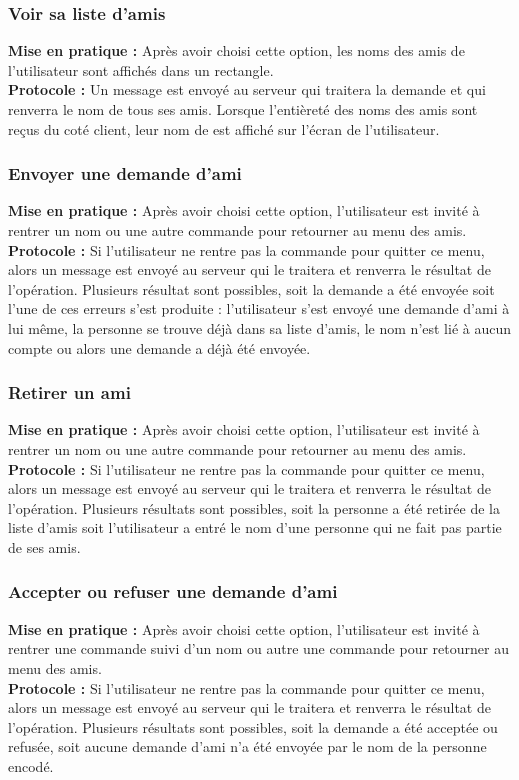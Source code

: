 \documentclass[10pt, a4paper]{article}
\begin{document}
\subsubsection{Voir sa liste d'amis}
\textbf{Mise en pratique :} Après avoir choisi cette option, les noms des amis de l'utilisateur sont affichés dans un rectangle.\\
\textbf{Protocole :} Un message est envoyé au serveur qui traitera la demande et qui renverra le nom de tous ses amis. Lorsque l'entièreté des noms des amis sont reçus du coté client,  leur nom de est affiché sur l'écran de l'utilisateur.\\

\subsubsection{Envoyer une demande d'ami}
\textbf{Mise en pratique :} Après avoir choisi cette option, l'utilisateur est invité à rentrer un nom ou une autre commande pour retourner au menu des amis.\\
\textbf{Protocole :} Si l'utilisateur ne rentre pas la commande pour quitter ce menu, alors un message est envoyé au serveur qui le traitera et renverra le résultat de l'opération. Plusieurs résultat sont possibles, soit la demande a été envoyée soit l'une de ces erreurs s'est produite : l'utilisateur s'est envoyé une demande d'ami à lui même, la personne se trouve déjà dans sa liste d'amis, le nom n'est lié à aucun compte ou alors une demande a déjà été envoyée. \\

\subsubsection{Retirer un ami}
\textbf{Mise en pratique :} Après avoir choisi cette option, l'utilisateur est invité à rentrer un nom ou une autre commande pour retourner au menu des amis.\\
\textbf{Protocole :} Si l'utilisateur ne rentre pas la commande pour quitter ce menu, alors un message est envoyé au serveur qui le traitera et renverra le résultat de l'opération. Plusieurs résultats sont possibles, soit la personne a été retirée de la liste d'amis soit l'utilisateur a entré le nom d'une personne qui ne fait pas partie de ses amis.\\

\subsubsection{Accepter ou refuser une demande d'ami}
\textbf{Mise en pratique :} Après avoir choisi cette option, l'utilisateur est invité à rentrer une commande suivi d'un nom ou autre une commande pour retourner au menu des amis.\\
\textbf{Protocole :} Si l'utilisateur ne rentre pas la commande pour quitter ce menu, alors un message est envoyé au serveur qui le traitera et renverra le résultat de l'opération. Plusieurs résultats sont possibles, soit la demande a été acceptée ou refusée, soit aucune demande d'ami n'a été envoyée par le nom de la personne encodé.\\
\end{document}
